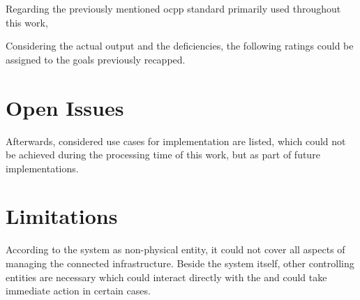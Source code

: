 Regarding the previously mentioned \acrshort{ocpp} standard primarily used throughout this work, 

Considering the actual output and the deficiencies, the following ratings could be assigned to the goals previously recapped.





\section{Open Issues}
\label{ch:Analysis and Validation:sec:Open Issues}

Afterwards, considered use cases for implementation are listed, which could not be achieved during the processing time of this work, but as part of future implementations.


\section{Limitations}
\label{ch:Analysis and Validation:sec:Limitations}

According to the system as non-physical entity, it could not cover all aspects of managing the connected infrastructure. Beside the system itself, other controlling entities are necessary which could interact directly with the  and could take immediate action in certain cases.

